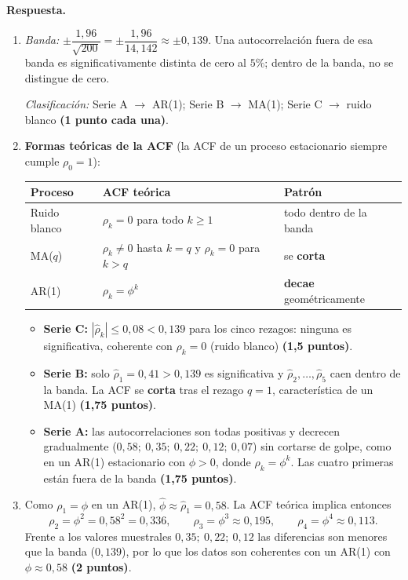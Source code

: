 \documentclass[12pt,letterpaper]{article}
\newcommand{\sol}{\color{blue}}
\begin{document}
\begin{enumerate}
{\sol
\textbf{Respuesta.}
\begin{enumerate}[label=\alph*)]
    \item \textit{Banda:} $\pm\dfrac{1{,}96}{\sqrt{200}}=\pm\dfrac{1{,}96}{14{,}142}\approx\pm0{,}139$. Una autocorrelación fuera de esa banda es significativamente distinta de cero al $5\%$; dentro de la banda, no se distingue de cero.

    \textit{Clasificación:} Serie A $\to$ AR(1); Serie B $\to$ MA(1); Serie C $\to$ ruido blanco \textbf{(1 punto cada una)}.

    \item \textbf{Formas teóricas de la ACF} (la ACF de un proceso estacionario siempre cumple $\rho_0=1$):
    \begin{center}
    \begin{tabular}{lll}
    \hline
    Proceso & ACF teórica & Patrón \\ \hline
    Ruido blanco & $\rho_k=0$ para todo $k\ge1$ & todo dentro de la banda \\
    MA($q$) & $\rho_k\neq0$ hasta $k=q$ y $\rho_k=0$ para $k>q$ & se \textbf{corta} \\
    AR(1) & $\rho_k=\phi^k$ & \textbf{decae} geométricamente \\
    \hline
    \end{tabular}
    \end{center}
        \begin{itemize}
        \item \textbf{Serie C:} $|\hat\rho_k|\le0{,}08<0{,}139$ para los cinco rezagos: ninguna es significativa, coherente con $\rho_k=0$ (ruido blanco) \textbf{(1,5 puntos)}.
        \item \textbf{Serie B:} solo $\hat\rho_1=0{,}41>0{,}139$ es significativa y $\hat\rho_2,\dots,\hat\rho_5$ caen dentro de la banda. La ACF se \textbf{corta} tras el rezago $q=1$, característica de un MA(1) \textbf{(1,75 puntos)}.
        \item \textbf{Serie A:} las autocorrelaciones son todas positivas y decrecen gradualmente ($0{,}58;\ 0{,}35;\ 0{,}22;\ 0{,}12;\ 0{,}07$) sin cortarse de golpe, como en un AR(1) estacionario con $\phi>0$, donde $\rho_k=\phi^k$. Las cuatro primeras están fuera de la banda \textbf{(1,75 puntos)}.
    \end{itemize}

    \item Como $\rho_1=\phi$ en un AR(1), $\hat\phi\approx\hat\rho_1=0{,}58$. La ACF teórica implica entonces
    \[
        \rho_2=\phi^2=0{,}58^2=0{,}336,\qquad \rho_3=\phi^3\approx0{,}195,\qquad \rho_4=\phi^4\approx0{,}113 .
    \]
    Frente a los valores muestrales $0{,}35;\ 0{,}22;\ 0{,}12$ las diferencias son menores que la banda ($0{,}139$), por lo que los datos son coherentes con un AR(1) con $\phi\approx0{,}58$ \textbf{(2 puntos)}.
\end{enumerate}}

\end{enumerate}
\end{document}
